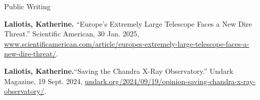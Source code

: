 \documentclass{resume} %
\begin{document}


\begin{rSection}{Public Writing}
\vspace{.3em}
\begin{rSubsection}{}{}{}{}
    
\item \textbf{Laliotis, Katherine.} “Europe’s Extremely Large Telescope Faces a New Dire Threat.” Scientific American, 30 Jan. 2025, \href{https://www.scientificamerican.com/article/europes-extremely-large-telescope-faces-a-new-dire-threat/}{www.scientificamerican.com/article/europes-extremely-large-telescope-faces-a-new-dire-threat/}.
\\
\item \textbf{Laliotis, Katherine.}“Saving the Chandra X-Ray Observatory.” Undark Magazine, 19 Sept. 2024, \href{undark.org/2024/09/19/opinion-saving-chandra-x-ray-observatory/}{undark.org/2024/09/19/opinion-saving-chandra-x-ray-observatory/}.
\end{rSubsection}

\end{rSection}

\end{document}
